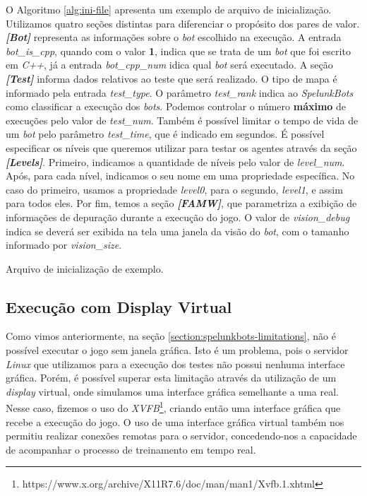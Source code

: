 O Algoritmo \ref{alg:ini-file} apresenta um exemplo de arquivo de inicialização.
Utilizamos quatro seções distintas para diferenciar o propósito dos pares de
valor. \textit{\textbf{[Bot]}} representa as informações sobre o \textit{bot}
escolhido na execução. A entrada \textit{bot\_is\_cpp}, quando com o valor
\textbf{1}, indica que se trata de um \textit{bot} que foi escrito em
\textit{C++}, já a entrada \textit{bot\_cpp\_num} idica qual \textit{bot} será
executado.  A seção \textit{\textbf{[Test]}} informa dados relativos ao teste
que será realizado. O tipo de mapa é informado pela entrada \textit{test\_type}.
O parâmetro \textit{test\_rank} indica ao \textit{SpelunkBots} como classificar
a execução dos \textit{bots}. Podemos controlar o número \textbf{máximo} de
execuções pelo valor de \textit{test\_num}. Também é possível limitar o tempo de
vida de um \textit{bot} pelo parâmetro \textit{test\_time}, que é indicado em
segundos.  É possível especificar os níveis que queremos utilizar para testar os
agentes através da seção \textit{\textbf{[Levels]}}. Primeiro, indicamos a
quantidade de níveis pelo valor de \textit{level\_num}. Após, para cada nível,
indicamos o seu nome em uma propriedade específica. No caso do primeiro, usamos
a propriedade \textit{level0}, para o segundo, \textit{level1}, e assim para
todos eles.  Por fim, temos a seção \textit{\textbf{[FAMW]}}, que parametriza a
exibição de informações de depuração durante a execução do jogo.  O valor de
\textit{vision\_debug} indica se deverá ser exibida na tela uma janela da visão
do \textit{bot}, com o tamanho informado por \textit{vision\_size}.

\begin{algorithm}[H]

	\caption[Exemplo de um arquivo de inicialização \textit{.INI}.]
{\label{alg:ini-file}Arquivo de inicialização de exemplo.}
\end{algorithm}

\subsection{\label{sub:virtual-display}Execução com Display Virtual}

Como vimos anteriormente, na seção \ref{section:spelunkbots-limitations}, não é
possível executar o jogo sem janela gráfica. Isto é um problema, pois o servidor
\textit{Linux} que utilizamos para a execução dos testes não possui nenhuma
interface gráfica.  Porém, é possível superar esta limitação através da
utilização de um \textit{display} virtual, onde simulamos uma interface gráfica
semelhante a uma real. Nesse caso, fizemos o uso do
\textit{XVFB}\footnote{https://www.x.org/archive/X11R7.6/doc/man/man1/Xvfb.1.xhtml},
criando então uma interface gráfica que recebe a execução do jogo. O uso de uma
interface gráfica virtual também nos permitiu realizar conexões remotas para o
servidor, concedendo-nos a capacidade de acompanhar o processo de treinamento em
tempo real.

